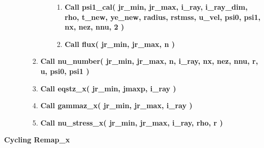 \documentclass[11pt,doublespace]{article}
\begin{document}
\begin{itemize}
\begin{enumerate}
\begin{enumerate}
\begin{enumerate}
\begin{enumerate}
\item {\bf Call psi1\_cal( jr\_min, jr\_max, i\_ray, i\_ray\_dim, rho, t\_new, ye\_new, radius,  rstmss, u\_vel, psi0, psi1, nx, nez, nnu, 2 )}

\item {\bf Call flux( jr\_min, jr\_max, n )}

\end{enumerate}

\end{enumerate}

\item {\bf Call nu\_number( jr\_min, jr\_max, n, i\_ray, nx, nez, nnu, r, u, psi0, psi1 )}

\item {\bf Call eqstz\_x( jr\_min, jmaxp, i\_ray )}

\item {\bf Call gammaz\_x( jr\_min, jr\_max, i\_ray )}

\item {\bf Call nu\_stress\_x( jr\_min, jr\_max, i\_ray, rho, r )}

\end{enumerate}

\end{enumerate}

\end{itemize}

{\bf Cycling Remap\_x}
\end{document}

